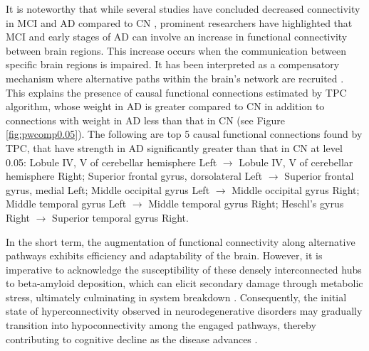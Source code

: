 \documentclass[12pt,reqno]{amsart}
\theoremstyle{definition}
\begin{document}
It is noteworthy that while several studies have concluded decreased connectivity in MCI and AD compared to CN \citep{jacobs2013meta,li2015toward,badhwar2017resting}, prominent researchers have highlighted that MCI and early stages of AD can involve an increase in functional connectivity between brain regions. This increase occurs when the communication between specific brain regions is impaired. It has been interpreted as a compensatory mechanism where alternative paths within the brain's network are recruited \citep{hillary2017injured, marek2022frontoparietal,oldham2019development}. This explains the presence of causal functional connections estimated by TPC algorithm, whose weight in AD is greater compared to CN in addition to connections with weight in AD less than that in CN (see Figure \ref{fig:pwcomp0.05}). The following are top 5 causal functional connections found by TPC, that have strength in AD significantly greater than that in CN at level 0.05: Lobule IV, V of cerebellar hemisphere Left $\rightarrow$ Lobule IV, V of cerebellar hemisphere Right; Superior frontal gyrus, dorsolateral Left $\rightarrow$ Superior frontal gyrus, medial Left; Middle occipital gyrus Left $\rightarrow$ Middle occipital gyrus Right; Middle temporal gyrus Left $\rightarrow$ Middle temporal gyrus Right; Heschl's gyrus Right $\rightarrow$ Superior temporal gyrus Right.

In the short term, the augmentation of functional connectivity along alternative pathways exhibits efficiency and adaptability of the brain. However, it is imperative to acknowledge the susceptibility of these densely interconnected hubs to beta-amyloid deposition, which can elicit secondary damage through metabolic stress, ultimately culminating in system breakdown \citep{hillary2017injured}. Consequently, the initial state of hyperconnectivity observed in neurodegenerative disorders may gradually transition into hypoconnectivity among the engaged pathways, thereby contributing to cognitive decline as the disease advances \citep{marek2022frontoparietal}.
\end{document}

